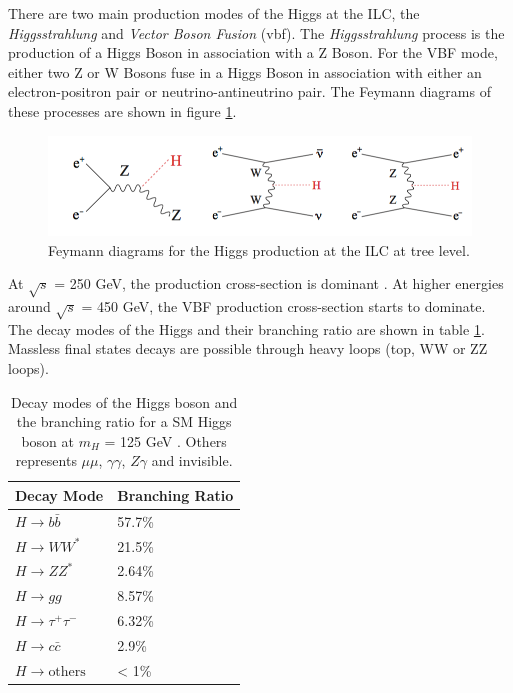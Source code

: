 There are two main production modes of the Higgs at the ILC, the \textit{Higgsstrahlung} and \textit{Vector Boson Fusion} (\acrshort{vbf}). The \textit{Higgsstrahlung} process is the production of a Higgs Boson in association with a Z Boson. For the VBF mode, either two Z or W Bosons fuse in a Higgs Boson in association with either an electron-positron pair or neutrino-antineutrino pair. The Feymann diagrams of these processes are shown in figure \ref{fig:HiggsProd}.

\begin{figure}[htbp!]
  \centering
  \includegraphics[width=1\linewidth]{chap2/fig/HiggsProd.png}
  \caption{Feymann diagrams for the Higgs production at the ILC at tree level. \cite{ILC_TDR_Vol2}} \label{fig:HiggsProd}
\end{figure}

At $\sqrt{s}$ = 250 GeV, the production cross-section is dominant \cite{Moortgat-Picka:2015yla}. At higher energies around $\sqrt{s}$ = 450 GeV, the VBF production cross-section starts to dominate. The decay modes of the Higgs and their branching ratio are shown in table \ref{table:BRHiggs}. Massless final states decays are possible through heavy loops (top, WW or ZZ loops).

\begin{table}
  \centering
  \caption{Decay modes of the Higgs boson and the branching ratio for a SM Higgs boson at $m_H$ = 125 GeV \cite{}. Others represents $\mu\mu$, $\gamma\gamma$, $Z\gamma$ and invisible.}
  \label{table:BRHiggs}
  \begin{tabular}{@{}ll@{}} \toprule
    Decay Mode & Branching Ratio \\ \midrule
    $H \rightarrow b\bar{b}$ & 57.7\% \\
    $H \rightarrow WW^*$ & 21.5\% \\
    $H \rightarrow ZZ^*$ & 2.64\% \\
    $H \rightarrow gg$ & 8.57\% \\
    $H \rightarrow \tau^+\tau^-$ & 6.32\% \\
    $H \rightarrow c\bar{c}$ & 2.9\% \\
    $H \rightarrow \text{others}$ & < 1\% \\
    \bottomrule
  \end{tabular}
\end{table}


